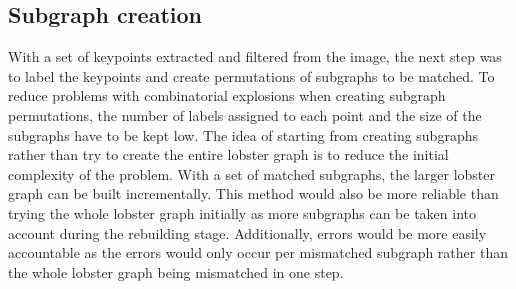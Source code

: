 \subsection{Subgraph creation}
With a set of keypoints extracted and filtered from the image, the next step was to label the keypoints and create permutations of subgraphs to be matched. To reduce problems with combinatorial explosions when creating subgraph permutations, the number of labels assigned to each point and the size of the subgraphs have to be kept low. The idea of starting from creating subgraphs rather than try to create the entire lobster graph is to reduce the initial complexity of the problem. With a set of matched subgraphs, the larger lobster graph can be built incrementally. This method would also be more reliable than trying the whole lobster graph initially as more subgraphs can be taken into account during the rebuilding stage. Additionally, errors would be more easily accountable as the errors would only occur per mismatched subgraph rather than the whole lobster graph being mismatched in one step. 

